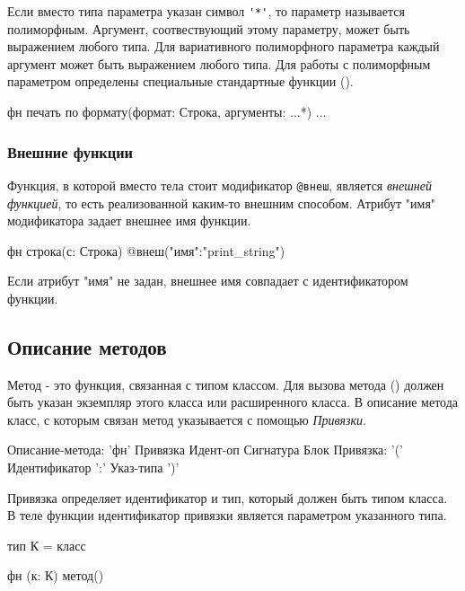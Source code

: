Если вместо типа параметра указан символ \verb|'*'|, то параметр называется полиморфным.
Аргумент, соотвествующий этому параметру, может быть выражением любого типа. 
Для вариативного полиморфного параметра каждый аргумент может быть выражением любого типа. 
Для работы с полиморфным параметром определены специальные стандартные функции ().

\begin{Trivil}
фн печать по формату(формат: Строка, аргументы: ...*) {
...
}
\end{Trivil}

\hypertarget{extern-fn}{%
\subsubsection{Внешние функции}\label{decls:extern-fn}}

Функция, в которой вместо тела стоит модификатор \verb|@внеш|, является \emph{внешней функцией}, то есть реализованной каким-то внешним способом.
Атрибут "имя" модификатора задает внешнее имя функции.

\begin{Trivil}
фн строка(с: Строка) @внеш("имя":"print_string")
\end{Trivil}

Если атрибут "имя" не задан, внешнее имя совпадает с идентификатором функции.

\hypertarget{methods}{%
\subsection{Описание методов}\label{decls:methods}}

Метод - это функция, связанная с типом классом. Для вызова метода () должен быть указан экземпляр этого класса или расширенного класса. 
В описание метода класс, с которым связан метод указывается с помощью \emph{Привязки}.

\begin{Grammar}
Описание-метода: 'фн' Привязка Идент-оп Сигнатура Блок
Привязка: '(' Идентификатор ':' Указ-типа ')'
\end{Grammar} 

Привязка определяет идентификатор и тип, который должен быть типом класса. В теле функции идентификатор привязки является параметром указанного типа.

\begin{Trivil}
тип К = класс {}

фн (к: К) метод() {}
\end{Trivil}

